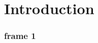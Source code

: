 \documentclass[xcolor=dvipsnames]{beamer}
\begin{document}
\section{Introduction}
\begin{frame}
\frametitle{frame 1}
\end{frame}
\end{document}
